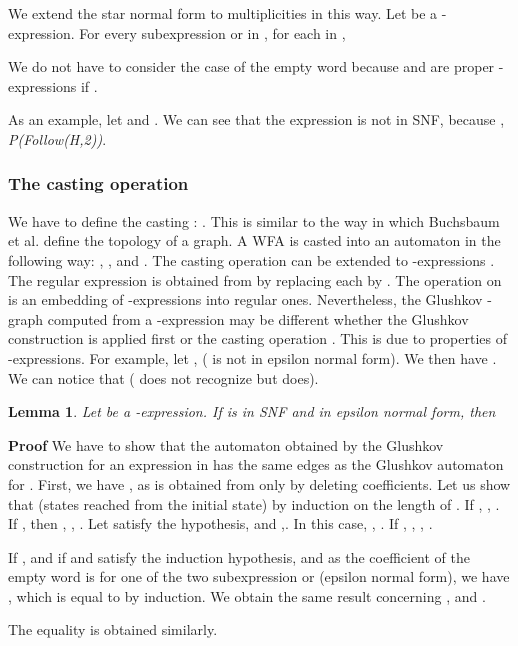 \documentclass[11pt]{article}
\newtheorem{lemma}[theorem]{Lemma}
\begin{document}
We extend the star normal form to multiplicities in this way. Let  be a -expression. 
For every subexpression  or  in , for each  in , 

We do not have to consider the case of the empty word because  and  are proper -expressions if .
  
As an example, let  and . We can see that the 
expression  is not in SNF, because
,  {\it P(Follow(H,2))}. 

\subsubsection*{The casting operation }
We have to define the casting : .  This is similar to the way in which  Buchsbaum et al. \cite{BGW00} define the topology of a graph.
 A WFA  is casted into an automaton  in the following way:
, ,  and .
 The casting operation can be extended to -expressions .
The regular expression  is obtained from  by replacing each  by .
The  operation on  is an embedding of -expressions 
into regular ones. Nevertheless, the Glushkov -graph computed from a -expression  may be different whether the Glushkov construction is applied first or the casting operation . This is due to properties of -expressions. For example, let ,  ( is not in epsilon normal form). We then have . We can notice that  ( does not recognize  but   does).\\





\begin{lemma}\label{rat1} 
Let  be a -expression.
 If  is in SNF and in epsilon normal form, then 
\end{lemma}

\noindent
{\bf Proof }We have to show that the automaton obtained by the Glushkov construction for an expression 
 in  has the same edges as the Glushkov automaton for .
First, we have , as  is obtained from  only by deleting coefficients.
Let us show that  (states reached from the initial state)
by induction on the length of . If , 
, . 
If ,  then , , . 
Let  satisfy the hypothesis, and ,. In this case, , 
.
 If , , , 
 .
 
 If , and if  and  satisfy the induction hypothesis, and as the coefficient of the empty word is  for one of the two subexpression  or  (epsilon normal form), we have 
 , 
 which is equal to   by induction. We obtain the same result concerning ,  and .

\noindent 
The equality  is obtained similarly.
 
\end{document}
